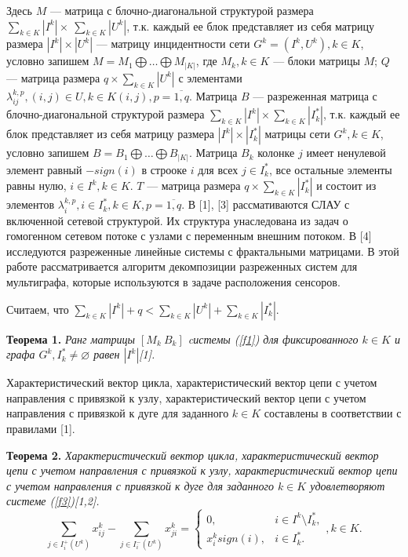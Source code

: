 \documentclass[14pt]{extarticle}%
\begin{document}
Здесь $M$ --- матрица с блочно-диагональной структурой размера \\$\sum_{k\in K}|I^k|\times~\sum_{k\in K}|U^k|$, т.к. каждый ее блок представляет из себя матрицу размера $|I^k|\times|U^k|$ --- матрицу инцидентности сети $G^k=(I^k,U^k), k\in K$, условно запишем $M=M_1\bigoplus\dots\bigoplus M_{|K|}$, где $M_k, k\in K$ --- блоки матрицы $M$; $Q$ --- матрица размера $q\times\sum_{k\in K}|U^k|$ с элементами $\lambda^{k,p}_{ij}, (i,j)\in U, k\in K(i,j), p=\overline{1,q}$. Матрица $B$ --- разреженная матрица с блочно-диагональной структурой размера $\sum_{k\in K}|I^k|\times \sum_{k\in K}|I^*_k|$, т.к. каждый ее блок представляет из себя матрицу размера $|I^k|\times|I^*_k|$ матрицы сети $G^k, k\in K$, условно запишем $B=B_1\bigoplus\dots\bigoplus B_{|K|}$. Матрица $B_k$ колонке $j$ имеет ненулевой элемент равный $-sign(i)$ в строоке $i$ для всех $j\in I^*_k$, все остальные элементы равны нулю, $i\in I^k, k\in K$. $T$ --- матрица размера $q\times\sum_{k\in K}|I^*_k|$ и состоит из элементов $\lambda^{k,p}_i, i\in I^*_k, k\in K, p=\overline{1,q}$. В [1], [3] рассмативаются СЛАУ с включенной сетевой структурой. Их структура унаследована из задач о гомогенном сетевом потоке с узлами с переменным внешним потоком. В [4] исследуются разреженные линейные системы с фрактальными матрицами. В этой работе рассматривается алгоритм декомпозиции разреженных систем для мультиграфа, которые используются в задаче расположения сенсоров.

Считаем, что $\sum_{k\in K}|I^k|+q<\sum_{k\in K}|U^k|+\sum_{k\in K}|I^*_k|$.

\textbf{Теорема 1.} \textit{Ранг матрицы $[M_k \ B_k]$ cистемы (\ref{f1}) для фиксированного $k\in K$ и графа $G^k, I^*_k\neq\varnothing$ равен $|I^k|$[1].}

Характеристический вектор цикла, характеристический вектор цепи с учетом направления с привязкой к узлу, характеристический вектор цепи с учетом направления с привязкой к дуге для заданного $k\in K$ составлены в соответствии с правилами [1].

\textbf{Теорема 2.} \textit{Характеристический вектор цикла, характеристический вектор цепи с учетом направления с привязкой к узлу, характеристический вектор цепи с учетом направления с привязкой к дуге для заданного $k\in K$ удовлетворяют системе (\ref{f3})[1,2].}
\begin{equation}
     \sum_{j\in I^+_i(U^k)} x^k_{ij}-\sum_{j\in I^-_i(U^k)}x^k_{ji}=\left\{\begin{matrix}
0, & i\in I^k\setminus I^*_k,\\ 
x^k_i sign(i), & i\in I^*_k.
\end{matrix}\right., k\in K.\label{f3} 
\end{equation}\\
\end{document}
